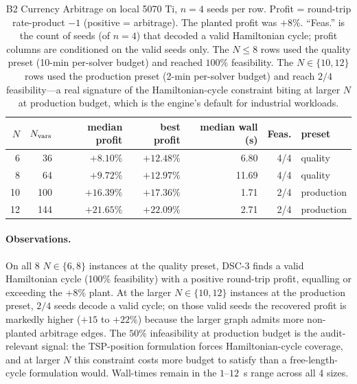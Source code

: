 \documentclass[11pt,a4paper]{article}
\begin{document}
\begin{table}[h]
\centering
\caption{B2 Currency Arbitrage on local 5070 Ti, $n\!=\!4$ seeds per
row. Profit = round-trip rate-product $-1$ (positive = arbitrage). The
planted profit was $+8\%$. ``Feas.'' is the count of seeds (of $n\!=\!4$)
that decoded a valid Hamiltonian cycle; profit columns are conditioned
on the valid seeds only. The $N\!\le\!8$ rows used the quality preset
(10-min per-solver budget) and reached $100\%$ feasibility. The
$N\!\in\!\{10, 12\}$ rows used the production preset (2-min per-solver
budget) and reach $2/4$ feasibility---a real signature of the
Hamiltonian-cycle constraint biting at larger $N$ at production budget,
which is the engine's default for industrial workloads.}
\label{tab:b2_results}
\small
\begin{tabular}{rrrrrrl}
\toprule
$N$ & $N_{\rm vars}$ & median profit & best profit & median wall (s) & Feas. & preset \\
\midrule
6  & 36  & $+8.10\%$  & $+12.48\%$ & 6.80 & 4/4 & quality \\
8  & 64  & $+9.72\%$  & $+12.97\%$ & 11.69 & 4/4 & quality \\
10 & 100 & $+16.39\%$ & $+17.36\%$ & 1.71 & 2/4 & production \\
12 & 144 & $+21.65\%$ & $+22.09\%$ & 2.71 & 2/4 & production \\
\bottomrule
\end{tabular}
\end{table}

\paragraph{Observations.} On all 8 $N\!\in\!\{6, 8\}$ instances at the
quality preset, DSC-3 finds a valid Hamiltonian cycle (100\%
feasibility) with a positive round-trip profit, equalling or exceeding
the $+8\%$ plant. At the larger $N\!\in\!\{10, 12\}$ instances at the
production preset, $2/4$ seeds decode a valid cycle; on those valid
seeds the recovered profit is markedly higher
($+15$ to $+22\%$) because the larger graph admits more
non-planted arbitrage edges. The $50\%$ infeasibility at production
budget is the audit-relevant signal: the TSP-position formulation
forces Hamiltonian-cycle coverage, and at larger $N$ this constraint
costs more budget to satisfy than a free-length-cycle formulation would.
Wall-times remain in the $1$--$12$~s range across all 4 sizes.

\end{document}
